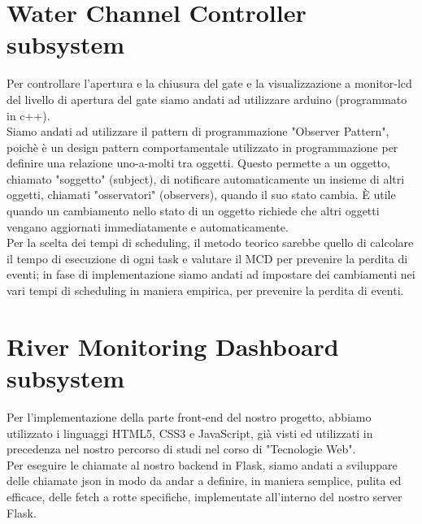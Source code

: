 \documentclass{article}
\begin{document}
\section*{Water Channel Controller subsystem}
Per controllare l'apertura e la chiusura del gate e la visualizzazione a monitor-lcd del livello di apertura del gate siamo andati ad utilizzare arduino (programmato in c++).  \\
Siamo andati ad utilizzare il pattern di programmazione "Observer Pattern", poichè è un design pattern comportamentale utilizzato in programmazione per definire una relazione uno-a-molti tra oggetti. Questo permette a un oggetto, chiamato "soggetto" (subject), di notificare automaticamente un insieme di altri oggetti, chiamati "osservatori" (observers), quando il suo stato cambia. È utile quando un cambiamento nello stato di un oggetto richiede che altri oggetti vengano aggiornati immediatamente e automaticamente.\\  Per la scelta dei tempi di scheduling, il metodo teorico sarebbe quello di calcolare il tempo di esecuzione di ogni task e valutare il MCD per prevenire la perdita di eventi; in fase di implementazione siamo andati ad impostare dei cambiamenti nei vari tempi di scheduling in maniera empirica, per prevenire la perdita di eventi.

\section*{River Monitoring Dashboard subsystem}
Per l'implementazione della parte front-end del nostro progetto, abbiamo utilizzato i linguaggi HTML5, CSS3 e JavaScript, già visti ed utilizzati in precedenza nel nostro percorso di studi nel corso di "Tecnologie Web". \\ Per eseguire le chiamate al nostro backend in Flask, siamo andati a sviluppare delle chiamate json in modo da andar a definire, in maniera semplice, pulita ed efficace, delle fetch a rotte specifiche, implementate all'interno del nostro server Flask.
\end{document}
